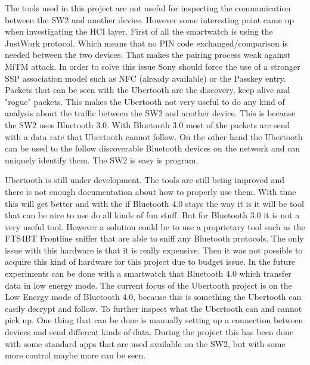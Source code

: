 The tools used in this project are not useful for inspecting the communication between the SW2 and another device. However some interesting point came up when investigating the HCI layer. First of all the smartwatch is using the JustWork protocol. Which means that no PIN code exchanged/comparison is needed between the two devices. That makes the pairing process weak against MiTM attack. In order to solve this issue Sony should force the use of a stronger SSP association model such as NFC (already available) or the Passkey entry. Packets that can be seen with the Ubertooth are the discovery, keep alive and  "rogue" packets. This makes the Ubertooth not very useful to do any kind of analysis about the traffic between the SW2 and another device. This is because the SW2 uses Bluetooth 3.0. With Bluetooth 3.0  most of the packets are send with a data rate that Ubertooth cannot follow. \pend  On the other hand the Ubertooth can be used to the follow discoverable Bluetooth devices on the network and can uniquely identify them. The SW2 is easy is program. 

Ubertooth is still under development. The tools are still being improved and there is not enough documentation about how to properly use them. With time this will get better and with the if Bluetooth 4.0 stays the way it is it will be tool that can be nice to use do all kinds of fun stuff. But for Bluetooth 3.0 it is not a very useful tool. However a solution could be to use a proprietary tool such as the FTS4BT Frontline sniffer \cite{FTS4BT} that are able to sniff any Bluetooth protocols. The only issue with this hardware is that it is really expensive. Then it was not possible to acquire this kind of hardware for this project due to budget issue.
\pend
In the future experiments can be done with a smartwatch that Bluetooth 4.0 which transfer data in low energy mode. The current focus of the Ubertooth project is on the Low Energy mode of Bluetooth 4.0, because this is something the Ubertooth can easily decrypt and follow. 
To further inspect what the Ubertooth can and cannot pick up. One thing that can be done is manually setting up a connection between devices and send different kinds of data. During the project this has been done with some standard apps that are used available on the SW2, but with some more control maybe more can be seen. \pend